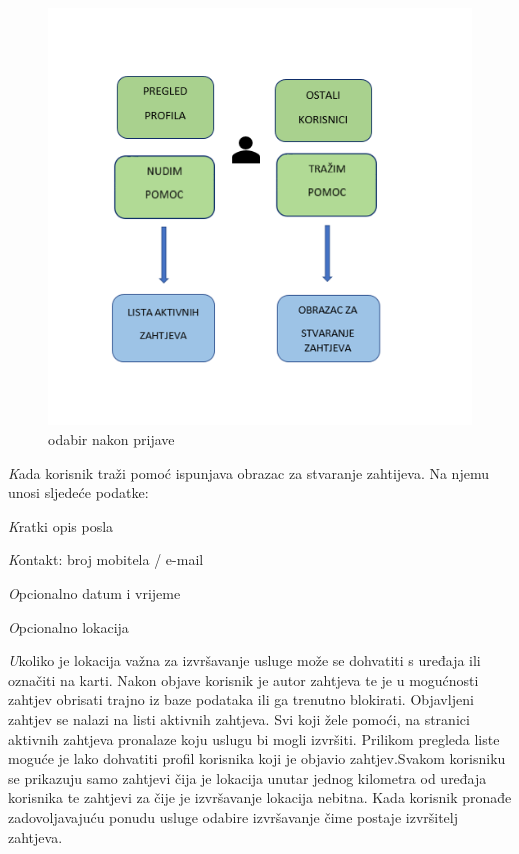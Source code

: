 		\begin{figure}[H]
			\includegraphics[scale=0.6]{slike/projekt1.png} %
			\centering
			\caption {odabir nakon prijave}
			\label{fig:promjene}
		\end{figure}
		
		\textit Kada korisnik traži pomoć ispunjava obrazac za stvaranje zahtijeva. Na njemu unosi sljedeće podatke:
		
		\begin{packed_item}
			\item \textit Kratki opis posla
			\item \textit Kontakt: broj mobitela / e-mail
			\item \textit Opcionalno datum i vrijeme
			\item \textit Opcionalno lokacija
		\end{packed_item}

        \textit Ukoliko je lokacija važna za izvršavanje usluge može se dohvatiti s uređaja ili označiti na karti.
        \newline
Nakon objave korisnik je autor zahtjeva te je u mogućnosti zahtjev obrisati trajno iz baze podataka ili ga trenutno blokirati. Objavljeni zahtjev se nalazi na listi aktivnih zahtjeva.
\newline
Svi koji žele pomoći, na stranici aktivnih zahtjeva pronalaze koju uslugu bi mogli izvršiti. Prilikom pregleda liste moguće je lako dohvatiti profil korisnika koji je objavio zahtjev.Svakom korisniku se prikazuju samo zahtjevi čija je lokacija unutar jednog kilometra od uređaja korisnika te zahtjevi za čije je izvršavanje lokacija nebitna. Kada korisnik pronađe zadovoljavajuću ponudu usluge odabire izvršavanje čime postaje izvršitelj zahtjeva.

